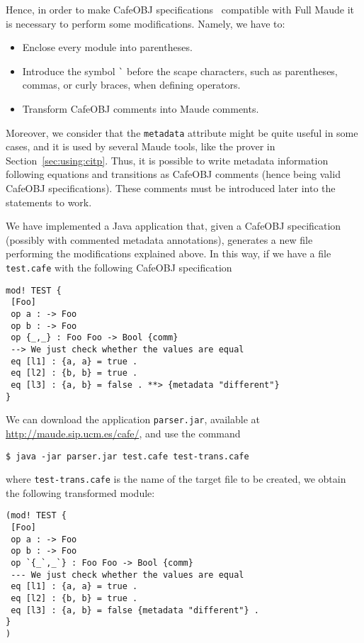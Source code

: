 
Hence, in order to make CafeOBJ specifications~\cite{cafe-report} compatible with Full Maude it
is necessary to perform some modifications. Namely, we have to:
\begin{itemize}
\item
Enclose every module into parentheses.

\item
Introduce the symbol \verb"`" before the scape characters, such as parentheses, commas,
or curly braces, when defining operators.

\item
Transform CafeOBJ comments into Maude comments.
\end{itemize}

Moreover, we consider that the \texttt{metadata} attribute might be quite useful in some cases, and it
is used by several Maude tools, like the prover in Section~\ref{sec:using:citp}. Thus, it
is possible to write metadata information following equations and transitions as CafeOBJ
comments (hence being valid CafeOBJ specifications). These comments must be introduced later
into the statements to work.

We have implemented a Java application that, given a CafeOBJ specification (possibly with
commented metadata annotations), generates a new file performing the modifications explained
above. In this way, if we have a file \verb"test.cafe" with the following CafeOBJ specification

{\codesize
\begin{verbatim}
mod! TEST {
 [Foo]
 op a : -> Foo
 op b : -> Foo
 op {_,_} : Foo Foo -> Bool {comm}
 --> We just check whether the values are equal
 eq [l1] : {a, a} = true .
 eq [l2] : {b, b} = true .
 eq [l3] : {a, b} = false . **> {metadata "different"}
}
\end{verbatim}
}

We can download the application \verb"parser.jar", available at \url{http://maude.sip.ucm.es/cafe/},
and use the command

{\codesize
\begin{verbatim}
$ java -jar parser.jar test.cafe test-trans.cafe
\end{verbatim}
}

\noindent
where \verb"test-trans.cafe" is the name of the target file to be created, we obtain the following
transformed module:

{\codesize
\begin{verbatim}
(mod! TEST {
 [Foo]
 op a : -> Foo
 op b : -> Foo
 op `{_`,_`} : Foo Foo -> Bool {comm}
 --- We just check whether the values are equal
 eq [l1] : {a, a} = true .
 eq [l2] : {b, b} = true .
 eq [l3] : {a, b} = false {metadata "different"} .
}
)
\end{verbatim}
}

